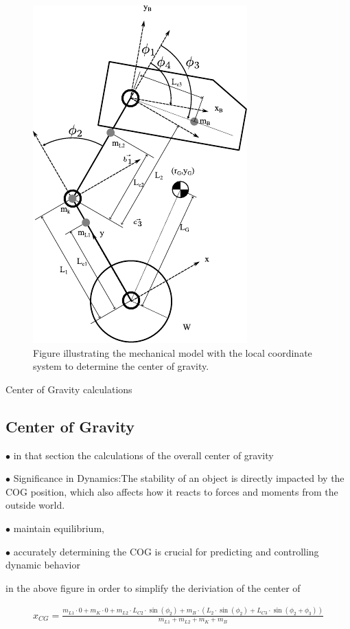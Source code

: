 	\begin{figure}[h]
		\centering
		\includegraphics[width=.5\textwidth]{Model}
		\caption[Mechanical model with the local coordinate system]{Figure illustrating the mechanical model with the local coordinate system to determine the center of gravity.}
		\label{Mechanical model with the local coordinate system}
	\end{figure}



	Center of Gravity calculations 
	\subsection{Center of Gravity } 
	$\bullet$ in that section the calculations of the overall center of gravity 
	
	$\bullet$ Significance in Dynamics:The stability of an object is directly impacted by the COG position, which also affects how it reacts to forces and moments from the outside world.
	
	$\bullet$ maintain equilibrium, 
	
	$\bullet$ accurately determining the COG is crucial for predicting and controlling dynamic behavior
	
	
	in the above figure in order to simplify the deriviation of the center of 
	
	\begin{equation}
		\begin{aligned}
			x_{CG} = \frac{m_{L1} \cdot 0 + m_K \cdot 0 + m_{L2} \cdot L_{C2} \cdot \sin(\phi_2) + m_B \cdot (L_2 \cdot \sin(\phi_2) + L_{C3} \cdot \sin(\phi_2 + \phi_3))}{m_{L1} + m_{L2} + m_K + m_B}
		\end{aligned}
	\end{equation}
	
